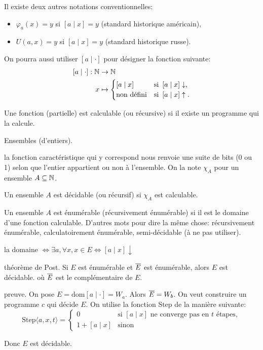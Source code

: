 Il existe deux autres notations conventionnelles:
\begin{itemize}
    \item \(\varphi_a(x) = y\) si \(\left[a\mid x\right] = y\) (standard historique américain),

    \item \(U(a,x) = y\) si \(\left[a\mid x\right] = y\) (standard historique russe).
\end{itemize}

On pourra aussi utiliser \(\left[a\mid \cdot\right]\) pour désigner la fonction  suivante:
\begin{equation*}
    \begin{aligned}
        \left[a\mid \cdot\right]: \mathbb{N} &\to \mathbb{N} \\
        x &\mapsto \begin{cases}
            \left[a\mid x\right] & \text{si } \left[a\mid x\right]\downarrow, \\
            \text{non défini} & \text{si } \left[a\mid x\right]\uparrow.
        \end{cases}
    \end{aligned}
\end{equation*}

Une fonction (partielle) est calculable (ou récursive) si il existe un programme qui la calcule.

Ensembles (d'entiers).

la fonction caractéristique qui y correspond nous renvoie 
une suite de bits (0 ou 1) selon que l'entier appartient ou non à l'ensemble.
On la note \(\chi_A\) pour un ensemble \(A\subseteq \mathbb{N}\).

Un ensemble \(A\) est décidable (ou récursif) si \(\chi_A\) est calculable.

Un ensemble \(A\) est énumérable (récursivement énumérable) si il est le domaine d'une fonction calculable.
D'autres mots pour dire la même chose:
récursivement énumérable, calculatoirement énumérable, semi-décidable (à ne pas utiliser).

la domaine \(\iff \exists a, \forall x,x\in E \iff [a \mid x] \downarrow\)

théorème de Post.
Si \(E\) est énumérable et \(\overline{E}\) est énumérable, alors \(E\) est décidable.
où \(\overline{E}\) est le complémentaire de \(E\).

preuve.
On pose \(E = \text{dom} [a \mid \cdot] = W_a\). Alors
\(\overline{E} = W_b\).
On veut construire un programme \(c\) qui décide \(E\).
On utilise la fonction \(\text{Step}\) de la manière suivante:
\begin{equation*}
    \text{Step}\langle a,x,t \rangle = \begin{cases}
        0 & \text{si } [a \mid x] \text{ ne converge pas en } t \text{ étapes}, \\
        1 + [a \mid x] & \text{sinon}
    \end{cases}
\end{equation*}

Donc \(E\) est décidable.
